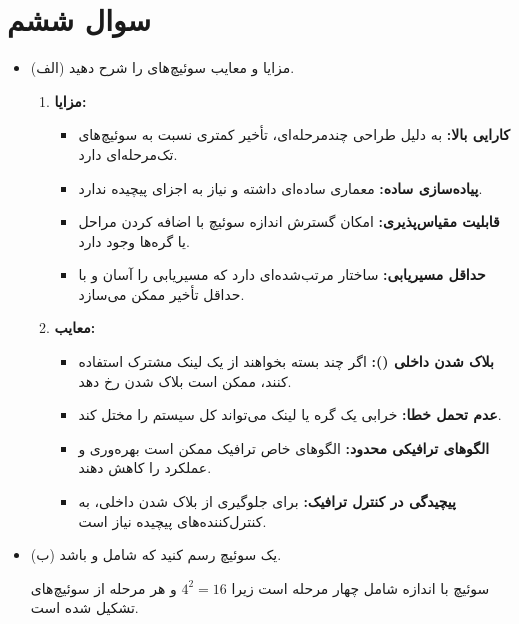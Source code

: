 \section{سوال ششم}

\begin{itemize}
	\item (الف) مزایا و معایب سوئیچ‌های  را شرح دهید.
	\begin{qsolve}
		\begin{enumerate}
			\item 
			\textbf{مزایا:}
			
			\begin{itemize}
				\item \textbf{کارایی بالا:}
				به دلیل طراحی چندمرحله‌ای، تأخیر کمتری نسبت به سوئیچ‌های تک‌مرحله‌ای دارد.
				\item \textbf{پیاده‌سازی ساده:}
				معماری ساده‌ای داشته و نیاز به اجزای پیچیده ندارد.
				\item \textbf{قابلیت مقیاس‌پذیری:}
				امکان گسترش اندازه سوئیچ با اضافه کردن مراحل یا گره‌ها وجود دارد.
				\item \textbf{حداقل مسیریابی:}
				ساختار مرتب‌شده‌ای دارد که مسیریابی را آسان و با حداقل تأخیر ممکن می‌سازد.
			\end{itemize}
			
			
			\item 
			\textbf{معایب:}
			
			\begin{itemize}
				\item \textbf{بلاک شدن داخلی ():}
				اگر چند بسته بخواهند از یک لینک مشترک استفاده کنند، ممکن است بلاک شدن رخ دهد.
				\item \textbf{عدم تحمل خطا:}
				خرابی یک گره یا لینک می‌تواند کل سیستم را مختل کند.
				\item \textbf{الگوهای ترافیکی محدود:}
				الگوهای خاص ترافیک ممکن است بهره‌وری و عملکرد را کاهش دهند.
				\item \textbf{پیچیدگی در کنترل ترافیک:}
				برای جلوگیری از بلاک شدن داخلی، به کنترل‌کننده‌های پیچیده نیاز است.
			\end{itemize}
		\end{enumerate}
	\end{qsolve}
	
	
	\item (ب) یک سوئیچ  رسم کنید که شامل  و  باشد.
	\begin{qsolve}
		سوئیچ  با اندازه  شامل چهار مرحله است زیرا $4^2 = 16$ و هر مرحله از سوئیچ‌های  تشکیل شده است.
		

\end{qsolve}
\end{itemize}
